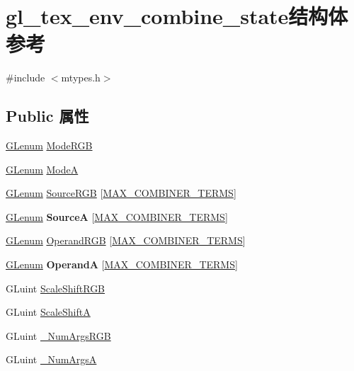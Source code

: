 \hypertarget{structgl__tex__env__combine__state}{}\section{gl\+\_\+tex\+\_\+env\+\_\+combine\+\_\+state结构体 参考}
\label{structgl__tex__env__combine__state}


{\ttfamily \#include $<$mtypes.\+h$>$}

\subsection*{Public 属性}
\begin{DoxyCompactItemize}
\item 
\hyperlink{interfacevoid}{G\+Lenum} \hyperlink{structgl__tex__env__combine__state_a549bed3ae6dfb000509be91acdd35254}{Mode\+R\+GB}
\item 
\hyperlink{interfacevoid}{G\+Lenum} \hyperlink{structgl__tex__env__combine__state_a517b081e756e70ecb5dde823a1b09692}{ModeA}
\item 
\hyperlink{interfacevoid}{G\+Lenum} \hyperlink{structgl__tex__env__combine__state_ad1c4026a3ed18308c3a6a986266c449d}{Source\+R\+GB} \mbox{[}\hyperlink{mtypes_8h_a575de92c2304b48ceea5fd8f6f2d3fa7}{M\+A\+X\+\_\+\+C\+O\+M\+B\+I\+N\+E\+R\+\_\+\+T\+E\+R\+MS}\mbox{]}
\item 
\mbox{\label{structgl__tex__env__combine__state_a15de3a6eb072a175186a50136c1f20d0}} 
\hyperlink{interfacevoid}{G\+Lenum} {\bfseries SourceA} \mbox{[}\hyperlink{mtypes_8h_a575de92c2304b48ceea5fd8f6f2d3fa7}{M\+A\+X\+\_\+\+C\+O\+M\+B\+I\+N\+E\+R\+\_\+\+T\+E\+R\+MS}\mbox{]}
\item 
\hyperlink{interfacevoid}{G\+Lenum} \hyperlink{structgl__tex__env__combine__state_a59ce78114e7deaf709a35233cca913d3}{Operand\+R\+GB} \mbox{[}\hyperlink{mtypes_8h_a575de92c2304b48ceea5fd8f6f2d3fa7}{M\+A\+X\+\_\+\+C\+O\+M\+B\+I\+N\+E\+R\+\_\+\+T\+E\+R\+MS}\mbox{]}
\item 
\mbox{\label{structgl__tex__env__combine__state_a75245ea454a7cff2fffd522c439dfea6}} 
\hyperlink{interfacevoid}{G\+Lenum} {\bfseries OperandA} \mbox{[}\hyperlink{mtypes_8h_a575de92c2304b48ceea5fd8f6f2d3fa7}{M\+A\+X\+\_\+\+C\+O\+M\+B\+I\+N\+E\+R\+\_\+\+T\+E\+R\+MS}\mbox{]}
\item 
G\+Luint \hyperlink{structgl__tex__env__combine__state_acf072780f5d4892424c515d296ef02c2}{Scale\+Shift\+R\+GB}
\item 
G\+Luint \hyperlink{structgl__tex__env__combine__state_a8fc16104bd756e0878275cc437bf20c8}{Scale\+ShiftA}
\item 
G\+Luint \hyperlink{structgl__tex__env__combine__state_a71d2b47ac937d91d2bb59f13a9474ff7}{\+\_\+\+Num\+Args\+R\+GB}
\item 
G\+Luint \hyperlink{structgl__tex__env__combine__state_a75e08f37339ce75d98c2573ea34efc49}{\+\_\+\+Num\+ArgsA}
\end{DoxyCompactItemize}


